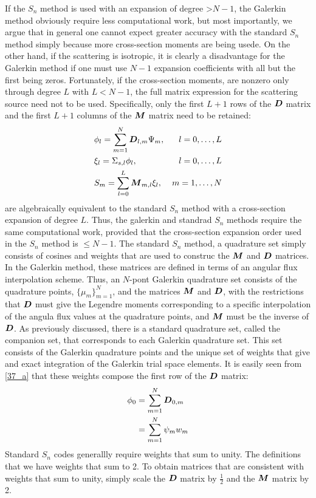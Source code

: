 If the $S_n$ method is used with an expansion of degree >$N-1$, the Galerkin
method obviously require less computational work, but most importantly, we
argue that in general one cannot expect greater accuracy with the standard
$S_n$ method simply because more cross-section moments are being usede. On the
other hand, if the scattering is isotropic, it is clearly a disadvantage for
the Galerkin method if one must use $N-1$ expansion coefficients with all but
the first being zeros. Fortunately, if the cross-section moments, are nonzero
only through degree $L$ with $L<N-1$, the full matrix expression for the
scattering source need not to be used. Specifically, only the first $L+1$ rows
of the $\boldsymbol{D}$ matrix and the first $L+1$ columns of the $\boldsymbol{M}$ matrix need
to be retained:
\begin{align}
&\phi_l = \sum_{m=1}^N \bs{D}_{l,m} \Psi_m, & l=0,\hdots,L \label{40_a}\\
&\xi_l = \Sigma_{s,l}\phi_l,& l=0,\hdots,L \label{40_b}\\
&S_m = \sum_{l=0}^L \bs{M}_{m,l} \xi_l,& m=1,\hdots,N \label{40_c}
\end{align}
 are algebraically equivalent to the standard $S_n$
method with a cross-section expansion of degree $L$. Thus, the galerkin and
standrad $S_n$ methods require the same computational work, provided that the
cross-section expansion order used in the $S_n$ method is $\leq N-1$. The
standard $S_n$ method, a quadrature set simply consists of cosines and weights
that are used to construc the $\boldsymbol{M}$ and $\boldsymbol{D}$ matrices. In the Galerkin
method, these matrices are defined in terms of an angular flux interpolation
scheme. Thus, an $N$-pont Galerkin quadrature set consists of the quadrature
points, $\{\mu_m\}_{m=1}^N$, and the matrices $\boldsymbol{M}$ and $\boldsymbol{D}$, with the
restrictions that $\boldsymbol{D}$ must give the Legendre moments corresponding to a
specific interpolation of the angula flux values at the quadrature points, and
$\boldsymbol{M}$ must be the inverse of $\boldsymbol{D}$. As previously discussed, there is a
standard quadrature set, called the companion set, that corresponds to each
Galerkin quadrature set. This set consists of the Galerkin quadrature points
and the unique set of weights that give and exact integration of the Galerkin
trial space elements. It is easily seen from \cref{37_a} that these weights
compose the first row of the $\boldsymbol{D}$ matrix:
\begin{equation}
\begin{split}
\phi_0 &= \sum_{m=1}^N \boldsymbol{D}_{0,m}\\
&=\sum_{m=1}^N \psi_m w_m
\end{split}
\end{equation}
Standard $S_n$ codes generallly require weights that sum to unity. The
definitions that we have weights that sum to 2. To obtain matrices that are
consistent with weights that sum to unity, simply scale the $\boldsymbol{D}$ matrix by
$\frac{1}{2}$ and the $\boldsymbol{M}$ matrix by 2.

